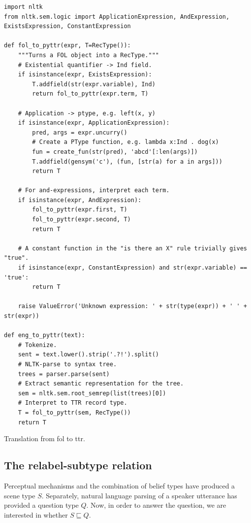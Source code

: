 \begin{listing}
\begin{lstlisting}[label=lst:foltopyttr]
import nltk
from nltk.sem.logic import ApplicationExpression, AndExpression, ExistsExpression, ConstantExpression

def fol_to_pyttr(expr, T=RecType()):
    """Turns a FOL object into a RecType."""
    # Existential quantifier -> Ind field.
    if isinstance(expr, ExistsExpression):
        T.addfield(str(expr.variable), Ind)
        return fol_to_pyttr(expr.term, T)
    
    # Application -> ptype, e.g. left(x, y)
    if isinstance(expr, ApplicationExpression):
        pred, args = expr.uncurry()
        # Create a PType function, e.g. lambda x:Ind . dog(x)
        fun = create_fun(str(pred), 'abcd'[:len(args)])
        T.addfield(gensym('c'), (fun, [str(a) for a in args]))
        return T
    
    # For and-expressions, interpret each term.
    if isinstance(expr, AndExpression):
        fol_to_pyttr(expr.first, T)
        fol_to_pyttr(expr.second, T)
        return T
    
    # A constant function in the "is there an X" rule trivially gives "true".
    if isinstance(expr, ConstantExpression) and str(expr.variable) == 'true':
        return T
    
    raise ValueError('Unknown expression: ' + str(type(expr)) + ' ' + str(expr))

def eng_to_pyttr(text):
    # Tokenize.
    sent = text.lower().strip('.?!').split()
    # NLTK-parse to syntax tree.
    trees = parser.parse(sent)
    # Extract semantic representation for the tree.
    sem = nltk.sem.root_semrep(list(trees)[0])
    # Interpret to TTR record type.
    T = fol_to_pyttr(sem, RecType())
    return T
\end{lstlisting}
\caption{Translation from \gls{fol} to \gls{ttr}.}
\end{listing}



\subsection{The relabel-subtype relation}
\label{sec:subtyperelabeling}

Perceptual mechanisms and the combination of belief types have produced a scene type $S$.
Separately, natural language parsing of a speaker utterance has provided a question type $Q$.
Now, in order to answer the question, we are interested in whether $S \sqsubseteq Q$.

